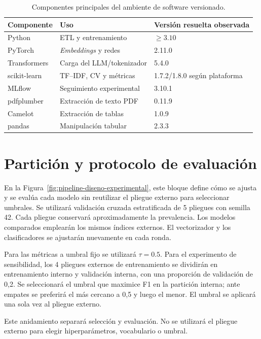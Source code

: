 \begin{table}[H]
\centering
\caption{Componentes principales del ambiente de software versionado.}
\label{tab:software}
\begin{tabular}{p{4.4cm}p{4cm}p{4cm}}
\toprule
\textbf{Componente} & \textbf{Uso} & \textbf{Versión resuelta observada} \\
\midrule
Python & ETL y entrenamiento & $\geq 3.10$ \\
PyTorch & \textit{Embeddings} y redes & 2.11.0 \\
Transformers & Carga del LLM/tokenizador & 5.4.0 \\
scikit-learn & TF--IDF, CV y métricas & 1.7.2/1.8.0 según plataforma \\
MLflow & Seguimiento experimental & 3.10.1 \\
pdfplumber & Extracción de texto PDF & 0.11.9 \\
Camelot & Extracción de tablas & 1.0.9 \\
pandas & Manipulación tabular & 2.3.3 \\
\bottomrule
\end{tabular}
\end{table}

\section{Partición y protocolo de evaluación}
\label{sec:particion_protocolo}

En la Figura~\ref{fig:pipeline-diseno-experimental}, este bloque define cómo se ajusta y se evalúa cada modelo sin reutilizar el pliegue externo para seleccionar umbrales. Se utilizará validación cruzada estratificada de 5 pliegues con semilla 42. Cada pliegue conservará aproximadamente la prevalencia. Los modelos comparados emplearán los mismos índices externos. El vectorizador y los clasificadores se ajustarán nuevamente en cada ronda.

Para las métricas a umbral fijo se utilizará $\tau=0.5$. Para el experimento de sensibilidad, los 4 pliegues externos de entrenamiento se dividirán en entrenamiento interno y validación interna, con una proporción de validación de 0,2. Se seleccionará el umbral que maximice F1 en la partición interna; ante empates se preferirá el más cercano a 0,5 y luego el menor. El umbral se aplicará una sola vez al pliegue externo.

Este anidamiento separará selección y evaluación. No se utilizará el pliegue externo para elegir hiperparámetros, vocabulario o umbral.

